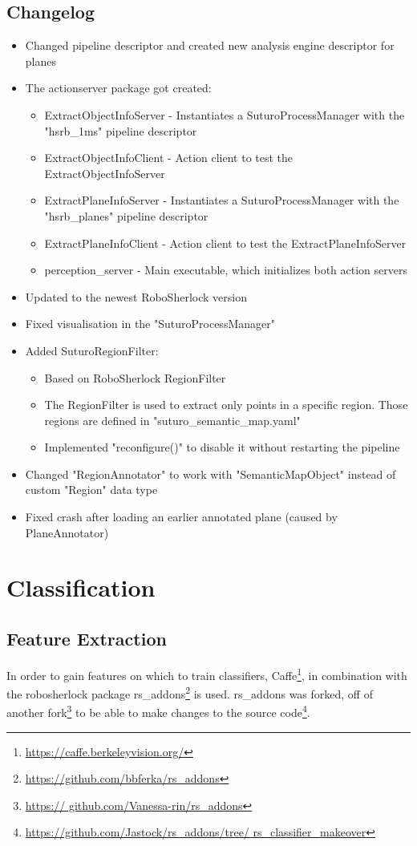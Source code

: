 \documentclass[main.tex]{subfiles}
\begin{document}
			\subsection{Changelog}
			\begin{itemize}
			\item Changed pipeline descriptor and created new analysis engine descriptor for planes
			\item The actionserver package got created:
				\begin{itemize}
				\item ExtractObjectInfoServer - Instantiates a SuturoProcessManager with the "hsrb\_1ms" pipeline descriptor
				\item ExtractObjectInfoClient - Action client to test the ExtractObjectInfoServer
				\item ExtractPlaneInfoServer - Instantiates a SuturoProcessManager with the "hsrb\_planes" pipeline descriptor
				\item ExtractPlaneInfoClient - Action client to test the ExtractPlaneInfoServer
				\item perception\_server - Main executable, which initializes both action servers
				\end{itemize}
			\item Updated to the newest RoboSherlock version
			\item Fixed visualisation in the "SuturoProcessManager"
			\item Added SuturoRegionFilter:
				\begin{itemize}
				\item Based on RoboSherlock RegionFilter
				\item The RegionFilter is used to extract only points in a specific region. Those regions are defined in "suturo\_semantic\_map.yaml"
				\item Implemented "reconfigure()" to disable it without restarting the pipeline
				\end{itemize}
			\item Changed "RegionAnnotator" to work with "SemanticMapObject" instead of custom "Region" data type
			\item Fixed crash after loading an earlier annotated plane (caused by PlaneAnnotator)
			\end{itemize}

		\section{Classification}
		    \subsection{Feature Extraction}
		    In order to gain features on which to train classifiers, Caffe\footnote{\url{https://caffe.berkeleyvision.org/}}, in combination with the robosherlock 				package rs\_addons\footnote{\url{https://github.com/bbferka/rs_addons}} is used. rs\_addons was forked, off of another fork\footnote{\url{https://					github.com/Vanessa-rin/rs_addons}} to be able to make changes to the source code\footnote{\url{https://github.com/Jastock/rs_addons/tree/								rs_classifier_makeover}}.\\
\end{document}
